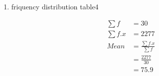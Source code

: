 \renewcommand{\theequation}{\theenumi}
\begin{enumerate}[label=\arabic*.,ref=\thesubsection.\theenumi]
\item \begin{table}[!ht]
	\centering
	
	\caption{friquency distribution table4 }
\end{table}
\begin{align}
\sum{f} &= 30
\\
\sum{f.x} &= 2277
\\
Mean &= \frac{\sum{f.x}}{\sum{f}}
\\ &= \frac{2277}{30}
\\&= 75.9
\end{align}
\end{enumerate}